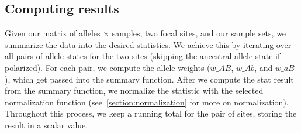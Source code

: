 \documentclass[12pt]{article}
\begin{document}
\subsection{Computing results}\label{section:computing_results}

Given our matrix of alleles $\times$ samples, two focal sites, and our sample
sets, we summarize the data into the desired statistics. We achieve this by
iterating over all pairs of allele states for the two sites (skipping the
ancestral allele state if polarized). For each pair, we compute the allele
weights ($w\_AB$, $w\_Ab$, and $w\_aB$), which get passed into the summary
function. After we compute the stat result from the summary function, we
normalize the statistic with the selected normalization function
(see~\ref{section:normalization} for more on normalization). Throughout this
process, we keep a running total for the pair of sites, storing the result in a
scalar value.
\end{document}
